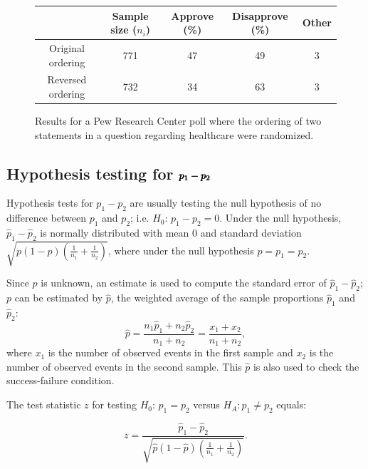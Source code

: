 \begin{figure}[h]
\centering
\begin{tabular}{c c c c c}
	& Sample size ($n_i$) & Approve (\%)	& Disapprove (\%)	& Other \\
\hline
Original ordering & 771	& 47	& 49	& 3 \\
Reversed ordering & 732	& 34	& 63	& 3 \\
\hline
\end{tabular}
\caption{Results for a Pew Research Center poll where the ordering of two statements in a question regarding healthcare were randomized.}
\label{pewPollResultsForRandomizedStatementOrdering}
\end{figure}




\subsection{Hypothesis testing for $\pmb{\MakeLowercase{p_1 - p_2}}$}


Hypothesis tests for $p_1 - p_2$ are usually testing the null hypothesis of no difference between $p_1$ and $p_2$; i.e. $H_0:\,p_1 - p_2 = 0$. Under the null hypothesis, $\hat{p}_1 - \hat{p}_2$ is normally distributed with mean 0 and standard deviation $\sqrt{p(1-p)(\frac{1}{n_1} + \frac{1}{n_2})}$, where under the null hypothesis $p = p_1 = p_2$.

Since $p$ is unknown, an estimate is used to compute the standard error of $\hat{p}_1 - \hat{p}_2$; $p$ can be estimated by $\hat{p}$, the weighted average of the sample proportions $\hat{p}_1$ and $\hat{p}_2$:
\[\hat{p} = \dfrac{n_{1}\hat{p}_1 + n_{2}\hat{p}_2}{n_{1} + n_{2}} = \dfrac{x_{1} + x_{2}}{n_{1} + n_{2}}, \]
where $x_1$ is the number of observed events in the first sample and $x_2$ is the number of observed events in the second sample. This  $\hat{p}$ is also used to check the success-failure condition.

The test statistic $z$ for testing $H_0:\, p_1 = p_2$ versus $H_A: p_1 \neq p_2$ equals:

\[z = \dfrac{\hat{p}_1 - \hat{p}_2}{\sqrt{\hat{p}(1-\hat{p})\left(\frac{1}{n_1} + \frac{1}{n_2} \right)}}. \]
 

